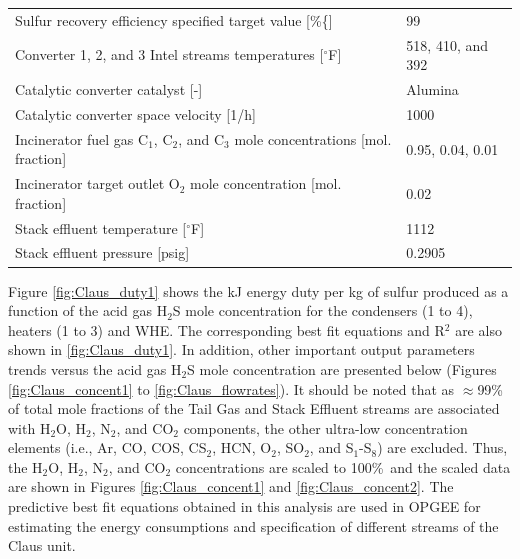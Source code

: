 \documentclass[11pt]{report}
\begin{document}
\begin{table}
\begin{scriptsize}
\begin{tabular*}{1\columnwidth}{p{}p{}}
Sulfur recovery efficiency specified target value {[}\%\{]}            &    99\\
Converter 1, 2, and 3 Intel streams temperatures {[}$^\circ$F{]}         &      518, 410, and 392     \\ 
Catalytic converter catalyst {[}-{]}                 &              Alumina \\
Catalytic converter space velocity {[}1/h{]}                     &      1000    \\
Incinerator fuel gas C$_1$, C$_2$, and C$_3$ mole concentrations {[}mol. fraction{]}         &        0.95, 0.04, 0.01    \\
Incinerator target outlet O$_2$ mole concentration {[}mol. fraction{]}                 &      0.02    \\
Stack effluent temperature {[}$^\circ$F{]}                &       1112    \\
Stack effluent pressure {[}psig{]}                        &        0.2905     \\
\bottomrule
\end{tabular*}
\end{scriptsize}
\end{table}

Figure \ref{fig:Claus_duty1} shows the kJ energy duty per kg of sulfur produced as a function of the acid gas H$_2$S mole concentration for the condensers (1 to 4), heaters (1 to 3) and WHE. The corresponding best fit equations and R$^2$ are also shown in \ref{fig:Claus_duty1}. In addition, other important output parameters trends versus the acid gas H$_2$S mole concentration are presented below (Figures \ref{fig:Claus_concent1} to \ref{fig:Claus_flowrates}). It should be noted that as $\approx$99\% of total mole fractions of the Tail Gas and Stack Effluent streams are associated with H$_2$O, H$_2$, N$_2$, and CO$_2$ components, the other ultra-low concentration elements (i.e., Ar, CO, COS, CS$_2$, HCN, O$_2$, SO$_2$, and S$_1$-S$_8$) are excluded. Thus, the H$_2$O, H$_2$, N$_2$, and CO$_2$ concentrations are scaled to 100\%\, and the scaled data are shown in Figures \ref{fig:Claus_concent1} and \ref{fig:Claus_concent2}. The predictive best fit equations obtained in this analysis are used in OPGEE for estimating the energy consumptions and specification of different streams of the Claus unit.         
\end{document}
